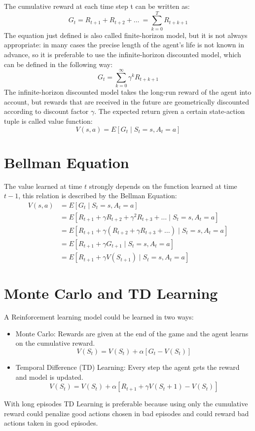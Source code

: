 \documentclass[binding=0.6cm,Lau,oneside]{sapthesis} %
\begin{document}
The cumulative reward at each time step  t can be written as:
\begin{equation}
G_t = R_{t+1} + R_{t+2} + \dots\ = \sum_{k=0}^{T}R_{t+k+1}
\end{equation}
The equation just defined is also called finite-horizon model, but it is not always appropriate: in many cases the precise length of the agent's life is not known in advance, so it is preferable to use the infinite-horizon discounted model, which can be defined in the following way:
\begin{equation}
G_t = \sum_{k=0}^{\infty}\gamma^k R_{t+k+1}
\end{equation}
The infinite-horizon discounted model takes the long-run reward of the agent into account, but rewards that are received in the future are geometrically discounted according to discount factor $\gamma$.
The expected return given a certain state-action tuple is called value function:
\begin{equation}
V(s,a) = E[G_t \mid S_t=s, A_t = a]
\end{equation}
\section{Bellman Equation}
The value learned at time $t$ strongly depends on the function learned at time $t-1$, this relation is described by the Bellman Equation:
\begin{align}
V(s, a) &= E[G_t \mid S_t=s, A_t = a] \\
&= E[R_{t+1} + \gamma R_{t+2} + \gamma^2 R_{t+3} + \dots \mid S_t=s, A_t = a] \\
&= E[R_{t+1} + \gamma (R_{t+2} + \gamma R_{t+3} + \dots) \mid S_t=s, A_t = a] \\
&= E[R_{t+1} + \gamma G_{t+1} \mid S_t=s, A_t = a] \\
&= E[R_{t+1} + \gamma V(S_{t+1}) \mid S_t=s, A_t = a]
\end{align}
\section{Monte Carlo and TD Learning}
A Reinforcement learning model could be learned in two ways:
\begin{itemize}
	\item Monte Carlo: Rewards are given at the end of the game and the agent learns on the cumulative reward.
	\begin{equation}
V( S_t ) = V( S_t ) + \alpha[ G_t - V(S_t) ]
	\end{equation}
	\item Temporal Difference (TD) Learning: Every step the agent gets the reward and model is updated.
	\begin{equation}
V( S_t ) = V( S_t ) + \alpha[ R_{t+1} + \gamma V(S_t+1)- V(S_t) ]
	\end{equation}
\end{itemize}
With long episodes TD Learning is preferable because using only the cumulative reward could penalize good actions chosen in bad episodes and could reward bad actions taken in good episodes.
\end{document}
